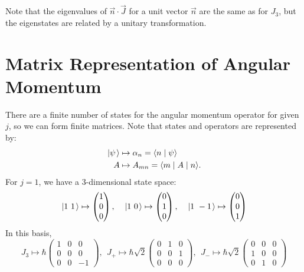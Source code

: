 \documentclass[../Main.tex]{subfiles}
\begin{document}
Note that the eigenvalues of $\vec{n} \cdot \vec{J}$ for a unit vector $\vec n$ are the same as for $J_3$, but the eigenstates are related by a unitary transformation.
\section{Matrix Representation of Angular Momentum}
There are a finite number of states for the angular momentum operator for given $j$, so we can form finite matrices. Note that states and operators are represented by:
\begin{align*}
    \left.\left|\psi\right.\right\rangle &\mapsto \alpha_n = \langle n\mid\psi\rangle \\
    A &\mapsto A_{mn} = \langle m\mid A\mid n\rangle.
\end{align*}
For $j = 1$, we have a 3-dimensional state space:
\begin{equation*}
    \left.\left|1~1\right.\right\rangle \mapsto \begin{pmatrix}1 \\ 0 \\ 0\end{pmatrix},\quad \left.\left|1~0\right.\right\rangle \mapsto \begin{pmatrix}0 \\ 1 \\ 0\end{pmatrix}, \quad\left.\left|1~-1\right.\right\rangle \mapsto \begin{pmatrix}0 \\ 0 \\ 1\end{pmatrix}
\end{equation*}
In this basis,
\begin{equation*}
    J_3 \mapsto \hbar
    \begin{pmatrix}
        1 & 0 & 0 \\
        0 & 0 & 0 \\
        0 & 0 & -1
    \end{pmatrix},~~
    J_+ \mapsto \hbar \sqrt{2}
    \begin{pmatrix}
        0 & 1 & 0 \\
        0 & 0 & 1 \\
        0 & 0 & 0
    \end{pmatrix},~~
    J_- \mapsto \hbar \sqrt{2}
    \begin{pmatrix}
        0 & 0 & 0 \\
        1 & 0 & 0 \\
        0 & 1 & 0
    \end{pmatrix}
\end{equation*}
\end{document}

